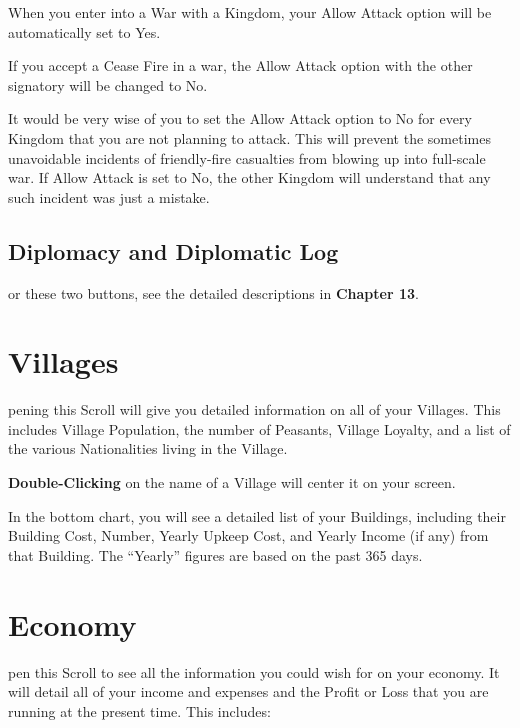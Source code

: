 {\begin{changemargin}{.1cm}{0cm}
When you enter into a War with a Kingdom, your Allow Attack option will be automatically set to Yes.

If you accept a Cease Fire in a war, the Allow Attack option with the other signatory will be changed to No.
\end{changemargin}


It would be very wise of you to set the Allow Attack option to No for every Kingdom that you are not planning to attack. This will prevent the sometimes unavoidable incidents of friendly-fire casualties from blowing up into full-scale war. If Allow Attack is set to No, the other Kingdom will understand that any such incident was just a mistake.

\subsection{\textsf{Diplomacy and Diplomatic Log}}

or these two buttons, see the detailed descriptions in \textbf{Chapter 13}.

\section{\textsf{Villages}}


pening this Scroll will give you detailed information on all of your Villages. This includes Village Population, the number of Peasants, Village Loyalty, and a list of the various Nationalities living in the Village.

\textbf{Double-Clicking} on the name of a Village will center it on your screen.


In the bottom chart, you will see a detailed list of your Buildings, including their Building Cost, Number, Yearly Upkeep Cost, and Yearly Income (if any) from that Building. The “Yearly” figures are based on the past 365 days.

\section{\textsf{Economy}}


pen this Scroll to see all the information you could wish for on your economy. It will detail all of your income and expenses and the Profit or Loss that you are running at the present time. This includes:

}

